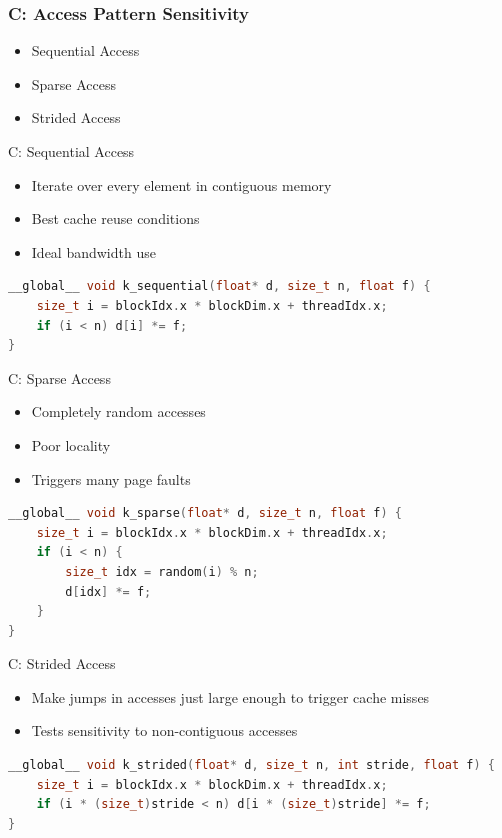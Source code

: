 \documentclass{beamer}
\begin{document}
\begin{frame}
\frametitle{C: Access Pattern Sensitivity}
\begin{itemize}
    \item Sequential Access 
    \item Sparse Access
    \item Strided Access
\end{itemize}
\end{frame}

\begin{frame}[fragile]{C: Sequential Access}
\begin{itemize}
    \item Iterate over every element in contiguous memory
    \item Best cache reuse conditions
    \item Ideal bandwidth use
\end{itemize}

\begin{lstlisting}[language=C++]
__global__ void k_sequential(float* d, size_t n, float f) {
    size_t i = blockIdx.x * blockDim.x + threadIdx.x;
    if (i < n) d[i] *= f;
}
\end{lstlisting}
\end{frame}

\begin{frame}[fragile]{C: Sparse Access}
\begin{itemize}
    \item Completely random accesses
    \item Poor locality
    \item Triggers many page faults
\end{itemize}

\begin{lstlisting}[language=C++]
__global__ void k_sparse(float* d, size_t n, float f) {
    size_t i = blockIdx.x * blockDim.x + threadIdx.x;
    if (i < n) {
        size_t idx = random(i) % n;
        d[idx] *= f;
    }
}
\end{lstlisting}

\end{frame}

\begin{frame}[fragile]{C: Strided Access}
\begin{itemize}
    \item Make jumps in accesses just large enough to trigger cache misses
    \item Tests sensitivity to non-contiguous accesses
\end{itemize}

\begin{lstlisting}[language=C++]
__global__ void k_strided(float* d, size_t n, int stride, float f) {
    size_t i = blockIdx.x * blockDim.x + threadIdx.x;
    if (i * (size_t)stride < n) d[i * (size_t)stride] *= f;
}
\end{lstlisting}

\end{frame}


\end{document}
